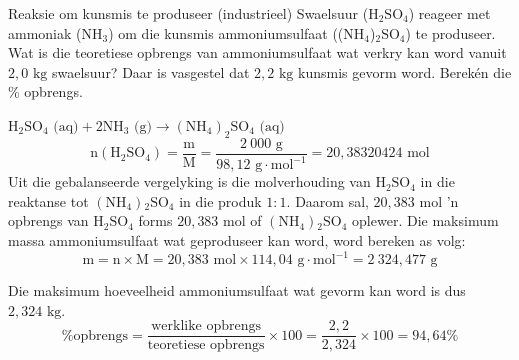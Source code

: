  \label{m38712*secfhsst!!!underscore!!!id2067}
      \noindent 
      \begin{wex}{Reaksie om kunsmis te produseer (industrieel) }
{
\label{m38712*probfhsst!!!underscore!!!id2068}
      \label{m38712*id284606}Swaelsuur ($\text{H}{}_{2}\text{SO}{}_{4}$) reageer met ammoniak ($\text{NH}{}_{3}$) om die kunsmis ammoniumsulfaat (($\text{NH}{}_{4}$)${}_{2}\text{SO}{}_{4}$) te produseer. Wat is die teoretiese opbrengs van ammoniumsulfaat wat verkry kan word vanuit $2,0 \text{ kg}$ swaelsuur? Daar is vasgestel dat $2,2 \text{ kg}$ kunsmis gevorm word. Berekén die $\%$ opbrengs. }
{
      \label{m38712*id284813}\nopagebreak\noindent{}
\label{m38712*id284690}${\text{H}}_{2}{\text{SO}}_{4} \text{ (aq)} + 2{\text{NH}}_{3}\text{ (g)} \to {({\text{NH}}_{4})}_{2}{\text{SO}}_{4}  \text{ (aq)}$
    \begin{equation*}
    \text{n} ({\text{H}}_{2}{\text{SO}}_{4}) = \frac{\text{m}}{\text{M}} = \frac{2~000 \text{ g}}{98,12 \text{ g} \cdot {\text{mol}}^{-1}} = 20,38320424\text{ mol}
      \end{equation*}
      \label{m38712*id285156}Uit die gebalanseerde vergelyking is die molverhouding van $\text{H}{}_{2}\text{SO}{}_{4}$ in die reaktanse tot $(\text{NH}{}_{4}){}_{2}\text{SO}{}_{4}$ in die produk $1:1$. Daarom sal, $20,383 \text{ mol}$  'n opbrengs van  $\text{H}{}_{2}\text{SO}{}_{4}$ forms $20,383 \text{ mol}$ of $(\text{NH}{}_{4}){}_{2}\text{SO}{}_{4}$ oplewer. 
      \label{m38712*id285290}Die maksimum massa ammoniumsulfaat wat geproduseer kan word, word bereken as volg:
      \label{m38712*id285296}\nopagebreak\noindent{}
    \begin{equation*}
    \text{m}=\text{n} \times \text{M} = 20,383 \text{ mol} \times 114,04 \text{ g} \cdot {\text{mol}}^{-1} = 2~324,477 \text{ g}
      \end{equation*}
      
      \label{m38712*id285362}Die maksimum hoeveelheid ammoniumsulfaat wat gevorm kan word is dus $2,324 \text{ kg}$.
\begin{equation*}
\text{\% opbrengs} = \frac{\text{werklike opbrengs}}{\text{teoretiese opbrengs}} \times 100 = \frac{2,2}{2,324} \times 100 = 94,64 \%\end{equation*}
}
    \end{wex}
\label{m38717*secfhsst!!!underscore!!!id695}
